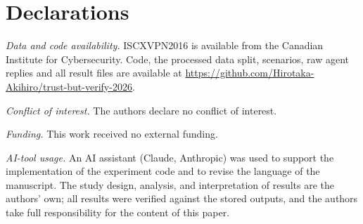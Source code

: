 \documentclass[conference,a4paper]{IEEEtran}
\begin{document}
\section*{Declarations}

\textit{Data and code availability.} ISCXVPN2016 is available from the Canadian Institute for Cybersecurity. Code, the processed data split, scenarios, raw agent replies and all result files are available at \url{https://github.com/Hirotaka-Akihiro/trust-but-verify-2026}.

\textit{Conflict of interest.} The authors declare no conflict of interest.

\textit{Funding.} This work received no external funding.

\textit{AI-tool usage.} An AI assistant (Claude, Anthropic) was used to support the implementation of the experiment code and to revise the language of the manuscript. The study design, analysis, and interpretation of results are the authors' own; all results were verified against the stored outputs, and the authors take full responsibility for the content of this paper.



\end{document}
